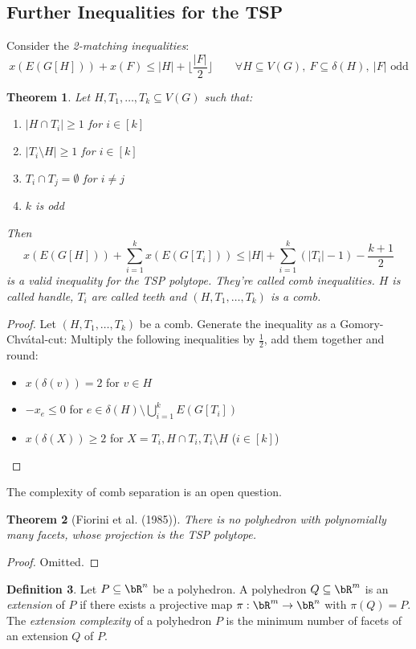 \documentclass[11pt, a4paper]{article}
\newcommand{\floor}[1]{\lfloor #1 \rfloor}
\newcommand{\abs}[1]{\left\lvert#1\right\rvert}
\newtheorem{theorem}{Theorem}[section]
\theoremstyle{remark}
\theoremstyle{definition}
\newtheorem{definition}[theorem]{Definition}
\begin{document}

\subsection{Further Inequalities for the TSP}
Consider the \emph{2-matching inequalities}:
\[x(E(G[H]))+x(F)\leq \abs{H}+\floor{\frac{\abs{F}}{2}} \qquad \forall H\subseteq V(G),\ F\subseteq\delta(H),\ \abs{F}\text{ odd}\]
\begin{theorem}
	Let $H,T_1,\ldots,T_k\subseteq V(G)$ such that:
	\begin{enumerate}
		\item $\abs{H\cap T_i}\geq1$ for $i\in[k]$
		\item $\abs{T_i\setminus H}\geq1$ for $i\in [k]$
		\item $T_i\cap T_j=\emptyset$ for $i\neq j$
		\item $k$ is odd
	\end{enumerate}
	Then
	\[x(E(G[H]))+\sum_{i=1}^kx(E(G[T_i]))\leq \abs{H}+\sum_{i=1}^k(\abs{T_i}-1)-\frac{k+1}{2}\]
	is a valid inequality for the TSP polytope. They're called \emph{comb
		inequalities}. $H$ is called \emph{handle}, $T_i$ are called
	\emph{teeth} and $(H,T_1,\ldots,T_k)$ is a comb.
\end{theorem}
\begin{proof}
	Let $(H,T_1,\ldots,T_k)$ be a comb. Generate the inequality as a
	Gomory-Chvátal-cut: Multiply the following inequalities by $\frac{1}{2}$,
	add them together and round:
	\begin{itemize}
		\item $x(\delta(v))=2$ for $v\in H$
		\item $-x_e\leq0$ for $e\in \delta(H)\setminus\bigcup_{i=1}^k E(G[T_i])$
		\item $x(\delta(X))\geq 2$ for $X=T_i,H\cap T_i,T_i\setminus H$ ($i\in[k]$)
	\end{itemize}
\end{proof}
The complexity of comb separation is an open question.


\begin{theorem}[Fiorini et al. (1985)]
	There is no polyhedron with polynomially many facets, whose projection
	is the TSP polytope.
\end{theorem}
\begin{proof}
	Omitted.
\end{proof}

\begin{definition}
	Let $P\subseteq \bR^n$ be a polyhedron. A polyhedron $Q\subseteq\bR^m$
	is an \emph{extension} of $P$ if there exists a projective map
	$\pi: \bR^m\to\bR^n$ with $\pi(Q)=P$.
	The \emph{extension complexity} of a polyhedron $P$ is the minimum number
	of facets of an extension $Q$ of $P$.
\end{definition}
\end{document}
